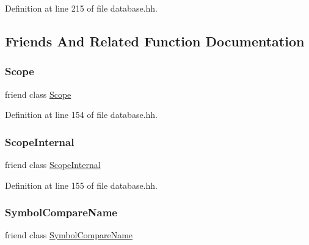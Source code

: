 Definition at line 215 of file database.\+hh.



\subsection{Friends And Related Function Documentation}
\mbox{\label{class_symbol_a921193447f6e42f596ac0a7694b02830}} 
\subsubsection{\texorpdfstring{Scope}{Scope}}
{\footnotesize\ttfamily friend class \mbox{\hyperlink{class_scope}{Scope}}\hspace{0.3cm}{\ttfamily [friend]}}



Definition at line 154 of file database.\+hh.

\mbox{\label{class_symbol_ac98dfa3807028fa4c8b288caf93501fc}} 
\subsubsection{\texorpdfstring{ScopeInternal}{ScopeInternal}}
{\footnotesize\ttfamily friend class \mbox{\hyperlink{class_scope_internal}{Scope\+Internal}}\hspace{0.3cm}{\ttfamily [friend]}}



Definition at line 155 of file database.\+hh.

\mbox{\label{class_symbol_ad07a9e8085d45ac5b2f79a212fb1443d}} 
\subsubsection{\texorpdfstring{SymbolCompareName}{SymbolCompareName}}
{\footnotesize\ttfamily friend class \mbox{\hyperlink{class_symbol_compare_name}{Symbol\+Compare\+Name}}\hspace{0.3cm}{\ttfamily [friend]}}



